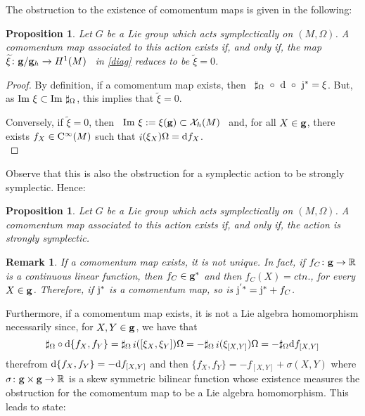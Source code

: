 \documentclass[12pt]{report}
\newtheorem{prop}[teor]{Proposition}
\newtheorem{remark}[teor]{Remark}
\def\qed{\ifvmode\removelastskip\fi
{\unskip\nobreak\hfil\penalty50\hbox{}\nobreak\hfil
\hbox{\vrule height1.2ex width1.2ex}\parfillskip=0pt
\finalhyphendemerits=0 \par\smallskip}}
\def\d{{\rm d}}
\def\Real{\mathbb{R}}
\def\inn{\mathop{i}\nolimits}
\def\Cinfty{{\rm C}^\infty}
\begin{document}
The obstruction to the existence of comomentum maps
is given in the following:

\begin{prop}
Let $G$ be a Lie group which acts symplectically on $(M,\Omega)$.
A comomentum map associated to this action exists
if, and only if, the map \ 
$\widetilde\xi \colon {\bf g}/{\bf g}_h \to H^1(M)$ \ 
in \eqref{diag} reduces to be $\widetilde \xi = 0$.
\end{prop}
\begin{proof}
By definition, if a comomentum map exists, then \ 
$\sharp_\Omega~\circ~\d~\circ~{\rm j}^* = \xi$.
But, as ${\rm Im}\ \xi \subset {\rm Im}\ \sharp_\Omega$,
this implies that $\widetilde\xi = 0$.

Conversely, if $\widetilde \xi = 0$, then \
${\rm Im}\ \xi := \xi ({\bf g}) \subset {\cal X}_h(M)$ \
and, for all $X \in {\bf g}$, there exists 
$f_X \in \Cinfty (M)$ such that $\inn(\xi_X)\Omega = \d f_X$.
\\ \qed  \end{proof}

Observe that this is also the obstruction
for a symplectic action to be strongly symplectic.
Hence:

\begin{prop}
Let $G$ be a Lie group which acts symplectically on $(M,\Omega)$.
A comomentum map associated to this action exists
if, and only if, the action is strongly symplectic.
\end{prop}

\begin{remark}{\rm 
If a comomentum map exists, it is not unique.
In fact, if $f_C \colon {\bf g} \to \Real$
is a continuous linear function, then $f_C \in {\bf g}^*$
and then $f_C(X) = ctn.$, for every $X \in {\bf g}$.
Therefore, if ${\rm j}^*$ is a comomentum map,
so is ${\rm j}^{'*}={\rm j}^*+f_C$.
}\end{remark}

Furthermore, if a comomentum map exists, it is not a
Lie algebra homomorphism necessarily since,
for $X,Y \in {\bf g}$, we have that
$$
\sharp_\Omega \circ \d \{ f_X,f_Y \} =
\sharp_\Omega\inn([\xi_X,\xi_Y])\Omega
= -\sharp_\Omega\inn(\xi_{[X,Y]})\Omega 
= -\sharp_\Omega \d f_{[X,Y]}
$$
therefrom
$\d \{ f_X,f_Y \} = -\d f_{[X,Y]}$ and then
$\{ f_X,f_Y \} = -f_{[X,Y]} + \sigma (X,Y)$
where $\sigma \colon {\bf g}\times{\bf g} \to \Real$
is a skew symmetric bilinear function
whose existence measures the obstruction for the
comomentum map to be a Lie algebra homomorphism.
This leads to state:
\end{document}
